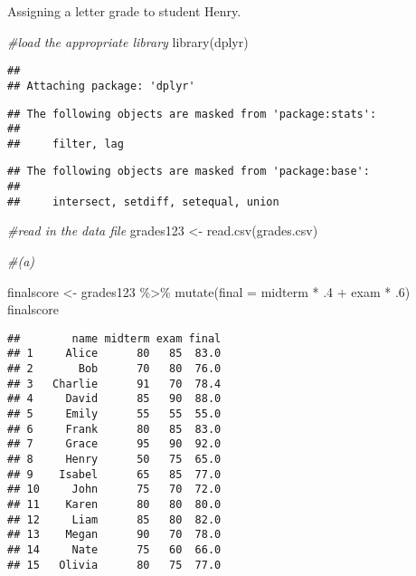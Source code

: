\documentclass[
]{article}
\newenvironment{Shaded}{\begin{snugshade}}{\end{snugshade}}
\newcommand{\AttributeTok}[1]{\textcolor[rgb]{0.77,0.63,0.00}{#1}}
\newcommand{\CommentTok}[1]{\textcolor[rgb]{0.56,0.35,0.01}{\textit{#1}}}
\newcommand{\DecValTok}[1]{\textcolor[rgb]{0.00,0.00,0.81}{#1}}
\newcommand{\FunctionTok}[1]{\textcolor[rgb]{0.00,0.00,0.00}{#1}}
\newcommand{\NormalTok}[1]{#1}
\newcommand{\OtherTok}[1]{\textcolor[rgb]{0.56,0.35,0.01}{#1}}
\newcommand{\SpecialCharTok}[1]{\textcolor[rgb]{0.00,0.00,0.00}{#1}}
\newcommand{\StringTok}[1]{\textcolor[rgb]{0.31,0.60,0.02}{#1}}
\begin{document}
Assigning a letter grade to student Henry.

\begin{Shaded}
\begin{Highlighting}[]
\CommentTok{\#load the appropriate library}
\FunctionTok{library}\NormalTok{(dplyr)}
\end{Highlighting}
\end{Shaded}

\begin{verbatim}
## 
## Attaching package: 'dplyr'
\end{verbatim}

\begin{verbatim}
## The following objects are masked from 'package:stats':
## 
##     filter, lag
\end{verbatim}

\begin{verbatim}
## The following objects are masked from 'package:base':
## 
##     intersect, setdiff, setequal, union
\end{verbatim}

\begin{Shaded}
\begin{Highlighting}[]
\CommentTok{\#read in the data file}
\NormalTok{grades123 }\OtherTok{\textless{}{-}} \FunctionTok{read.csv}\NormalTok{(}\StringTok{\textquotesingle{}grades.csv\textquotesingle{}}\NormalTok{)}

\CommentTok{\#(a)}

\NormalTok{finalscore }\OtherTok{\textless{}{-}}\NormalTok{ grades123 }\SpecialCharTok{\%\textgreater{}\%} 
  \FunctionTok{mutate}\NormalTok{(}\AttributeTok{final =}\NormalTok{ midterm }\SpecialCharTok{*}\NormalTok{ .}\DecValTok{4} \SpecialCharTok{+}\NormalTok{ exam }\SpecialCharTok{*}\NormalTok{ .}\DecValTok{6}\NormalTok{) }
\NormalTok{finalscore}
\end{Highlighting}
\end{Shaded}

\begin{verbatim}
##        name midterm exam final
## 1     Alice      80   85  83.0
## 2       Bob      70   80  76.0
## 3   Charlie      91   70  78.4
## 4     David      85   90  88.0
## 5     Emily      55   55  55.0
## 6     Frank      80   85  83.0
## 7     Grace      95   90  92.0
## 8     Henry      50   75  65.0
## 9    Isabel      65   85  77.0
## 10     John      75   70  72.0
## 11    Karen      80   80  80.0
## 12     Liam      85   80  82.0
## 13    Megan      90   70  78.0
## 14     Nate      75   60  66.0
## 15   Olivia      80   75  77.0
\end{verbatim}
\end{document}
